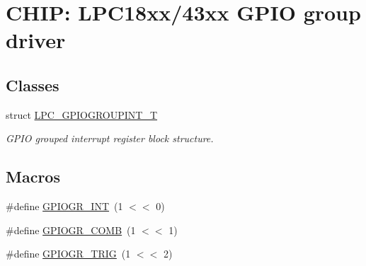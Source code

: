\hypertarget{group___g_p_i_o_g_p__18_x_x__43_x_x}{}\section{C\+H\+IP\+: L\+P\+C18xx/43xx G\+P\+IO group driver}
\label{group___g_p_i_o_g_p__18_x_x__43_x_x}
\subsection*{Classes}
\begin{DoxyCompactItemize}
\item 
struct \hyperlink{struct_l_p_c___g_p_i_o_g_r_o_u_p_i_n_t___t}{L\+P\+C\+\_\+\+G\+P\+I\+O\+G\+R\+O\+U\+P\+I\+N\+T\+\_\+T}
\begin{DoxyCompactList}\small\item\em G\+P\+IO grouped interrupt register block structure. \end{DoxyCompactList}\end{DoxyCompactItemize}
\subsection*{Macros}
\begin{DoxyCompactItemize}
\item 
\#define \hyperlink{group___g_p_i_o_g_p__18_x_x__43_x_x_gaf15160a16e7ec36a9046ad41d9b5e85b}{G\+P\+I\+O\+G\+R\+\_\+\+I\+NT}~(1 $<$$<$ 0)
\item 
\#define \hyperlink{group___g_p_i_o_g_p__18_x_x__43_x_x_ga99839b878e80485d41a8ed02c16a9aaf}{G\+P\+I\+O\+G\+R\+\_\+\+C\+O\+MB}~(1 $<$$<$ 1)
\item 
\#define \hyperlink{group___g_p_i_o_g_p__18_x_x__43_x_x_gad93f80c7a388c505b90dd0a8daa2f6b4}{G\+P\+I\+O\+G\+R\+\_\+\+T\+R\+IG}~(1 $<$$<$ 2)
\end{DoxyCompactItemize}
